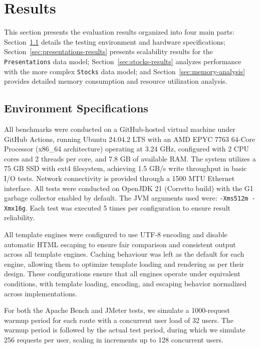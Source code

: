 \section{Results}

This section presents the evaluation results organized into four main parts:
Section~\ref{sec:environment} details the testing environment and hardware
specifications; Section~\ref{sec:presentations-results} presents scalability
results for the \texttt{Presentations} data model;
Section~\ref{sec:stocks-results} analyzes performance with the more complex
\texttt{Stocks} data model; and Section~\ref{sec:memory-analysis} provides
detailed memory consumption and resource utilization analysis.

\subsection{Environment Specifications}
\label{sec:environment}

All benchmarks were conducted on a GitHub-hosted virtual machine under GitHub
Actions, running Ubuntu 24.04.2 LTS with an AMD EPYC 7763 64-Core Processor
(x86\_64 architecture) operating at 3.24 GHz, configured with 2 CPU cores and 2
threads per core, and 7.8 GB of available RAM. The system utilizes a 75 GB SSD
with ext4 filesystem, achieving 1.5 GB/s write throughput in basic I/O tests.
Network connectivity is provided through a 1500 MTU Ethernet interface. All
tests were conducted on OpenJDK 21 (Corretto build) with the G1 garbage
collector enabled by default. The JVM arguments used were: \texttt{-Xms512m
     -Xmx16g}. Each test was executed 5 times per configuration to ensure result
reliability.

All template engines were configured to use UTF-8 encoding and disable
automatic HTML escaping to ensure fair comparison and consistent output across
all template engines. Caching behaviour was left as the default for each
engine, allowing them to optimize template loading and rendering as per their
design. These configurations ensure that all engines operate under equivalent
conditions, with template loading, encoding, and escaping behavior normalized
across implementations.

For both the Apache Bench and JMeter tests, we simulate a 1000-request warmup
period for each route with a concurrent user load of 32 users. The warmup
period is followed by the actual test period, during which we simulate 256
requests per user, scaling in increments up to 128 concurrent users.

